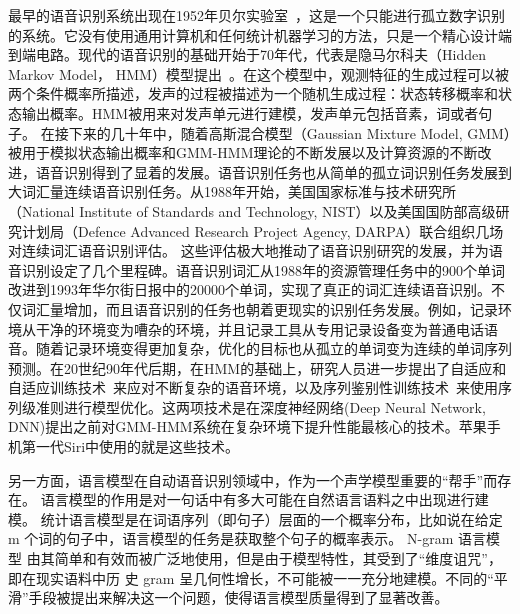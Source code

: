 最早的语音识别系统出现在1952年贝尔实验室~\cite{davis1952automatic}，这是一个只能进行孤立数字识别的系统。它没有使用通用计算机和任何统计机器学习的方法，只是一个精心设计端到端电路。现代的语音识别的基础开始于70年代，代表是隐马尔科夫（Hidden Markov Model， HMM）模型提出~\cite{baker1975dragon, jelinek1976continuous}。在这个模型中，观测特征的生成过程可以被两个条件概率所描述，发声的过程被描述为一个随机生成过程：状态转移概率和状态输出概率。HMM被用来对发声单元进行建模，发声单元包括音素，词或者句子。
在接下来的几十年中，随着高斯混合模型（Gaussian Mixture Model, GMM）被用于模拟状态输出概率和GMM-HMM理论的不断发展以及计算资源的不断改进，语音识别得到了显着的发展。语音识别任务也从简单的孤立词识别任务发展到大词汇量连续语音识别任务。从1988年开始，美国国家标准与技术研究所（National Institute of Standards and Technology, NIST）以及美国国防部高级研究计划局（Defence Advanced Research Project Agency, DARPA）联合组织几场对连续词汇语音识别评估。
这些评估极大地推动了语音识别研究的发展，并为语音识别设定了几个里程碑。语音识别词汇从1988年的资源管理任务中的900个单词改进到1993年华尔街日报中的20000个单词，实现了真正的词汇连续语音识别。不仅词汇量增加，而且语音识别的任务也朝着更现实的识别任务发展。例如，记录环境从干净的环境变为嘈杂的环境，并且记录工具从专用记录设备变为普通电话语音。随着记录环境变得更加复杂，优化的目标也从孤立的单词变为连续的单词序列预测。在20世纪90年代后期，在HMM的基础上，研究人员进一步提出了自适应和自适应训练技术~\cite{anastasakos1996compact,digalakis1995speaker,furui1989unsupervised,gales1998cluster,gales1998maximum,gales2001adaptive,gales2001multiple,gauvain1994maximum,kuhn1998eigenvoices,lee1996speaker,leggetter1995maximum,neumeyer1995comparative,pye1997experiments}来应对不断复杂的语音环境，以及序列鉴别性训练技术~\cite{bahl1986maximum,schluter2001comparison,chou1993minimum,goel2000minimum,juang1997minimum,povey2005discriminative,povey2001improved}来使用序列级准则进行模型优化。这两项技术是在深度神经网络(Deep Neural Network, DNN)提出之前对GMM-HMM系统在复杂环境下提升性能最核心的技术。苹果手机第一代Siri中使用的就是这些技术。

另一方面，语言模型在自动语音识别领域中，作为一个声学模型重要的“帮手”而存
在。
语言模型的作用是对一句话中有多大可能在自然语言语料之中出现进行建模。
统计语言模型是在词语序列（即句子）层面的一个概率分布，比如说在给定 m 个词的句子中，语言模型的任务是获取整个句子的概率表示。
%
N-gram 语言模型\cite{chen1999empirical} 由其简单和有效而被广泛地使用，但是由于模型特性，其受到了“维度诅咒”，即在现实语料中历
史 gram 呈几何性增长，不可能被一一充分地建模。不同的“平滑”手段被提出来解决这一个问题，使得语言模型质量得到了显著改善。

